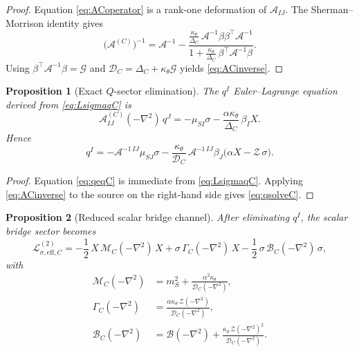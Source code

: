 \documentclass[11pt]{article}
\newtheorem{proposition}{Proposition}
\begin{document}
\begin{proof}
Equation \eqref{eq:ACoperator} is a rank-one deformation of \(\mathcal A_{IJ}\). The Sherman--Morrison identity gives
\[
\bigl(\mathcal A^{(C)}\bigr)^{-1}
=
\mathcal A^{-1}
-\frac{\frac{\kappa_\theta}{\Delta_C}\,\mathcal A^{-1}\beta\beta^\top\mathcal A^{-1}}
{1+\frac{\kappa_\theta}{\Delta_C}\,\beta^\top\mathcal A^{-1}\beta}.
\]
Using \(\beta^\top\mathcal A^{-1}\beta=\mathcal G\) and \(\mathcal D_C=\Delta_C+\kappa_\theta\mathcal G\) yields \eqref{eq:ACinverse}.
\end{proof}

\begin{proposition}[Exact \(Q\)-sector elimination]
The \(q^I\) Euler--Lagrange equation derived from \eqref{eq:LsigmaqC} is
\begin{equation}
\mathcal A_{IJ}^{(C)}(-\nabla^2)\,q^J
=
-\mu_{SI}\sigma
-\frac{\alpha\kappa_\theta}{\Delta_C}\,\beta_I X.
\label{eq:qeqC}
\end{equation}
Hence
\begin{equation}
q^I
=
-\mathcal A^{-1\,IJ}\mu_{SJ}\sigma
-\frac{\kappa_\theta}{\mathcal D_C}\,
\mathcal A^{-1\,IJ}\beta_J\bigl(\alpha X-\mathcal Z\,\sigma\bigr).
\label{eq:qsolveC}
\end{equation}
\end{proposition}

\begin{proof}
Equation \eqref{eq:qeqC} is immediate from \eqref{eq:LsigmaqC}. Applying \eqref{eq:ACinverse} to the source on the right-hand side gives \eqref{eq:qsolveC}.
\end{proof}

\begin{proposition}[Reduced scalar bridge channel]
After eliminating \(q^I\), the scalar bridge sector becomes
\begin{equation}
\mathcal L_{\sigma,\mathrm{eff},C}^{(2)}
=
-\frac{1}{2}\,
X\,\mathcal M_C(-\nabla^2)\,X
+\sigma\,\Gamma_C(-\nabla^2)\,X
-\frac{1}{2}\,
\sigma\,\mathcal B_C(-\nabla^2)\,\sigma,
\label{eq:LsigmaeffC}
\end{equation}
with
\begin{align}
\mathcal M_C(-\nabla^2)
&=
m_S^2+\frac{\alpha^2\kappa_\theta}{\mathcal D_C(-\nabla^2)},
\label{eq:Moperator}
\\
\Gamma_C(-\nabla^2)
&=
\frac{\alpha\kappa_\theta\,\mathcal Z(-\nabla^2)}
{\mathcal D_C(-\nabla^2)},
\label{eq:Gammaoperator}
\\
\mathcal B_C(-\nabla^2)
&=
\mathcal B(-\nabla^2)
+\frac{\kappa_\theta\,\mathcal Z(-\nabla^2)^2}
{\mathcal D_C(-\nabla^2)}.
\label{eq:BCoperator}
\end{align}
\end{proposition}
\end{document}
